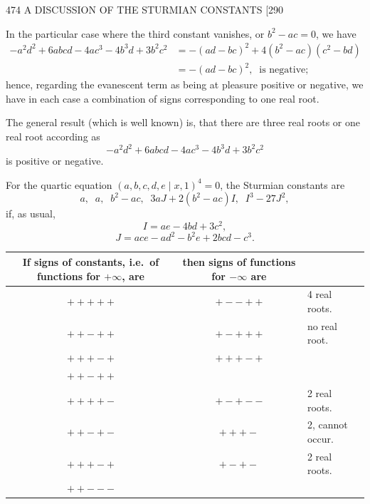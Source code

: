 \documentclass[11pt]{article}
\begin{document}
\begin{center}
474 \hfill A DISCUSSION OF THE STURMIAN CONSTANTS \hfill \textsc{[290}
\end{center}

In the particular case where the third constant vanishes, or $b^{2}-ac=0$,
we have
\begin{align*}
-a^{2}d^{2}+6abcd-4ac^{3}-4b^{3}d+3b^{2}c^{2}
&=-(ad-bc)^{2}+4(b^{2}-ac)(c^{2}-bd)\\
&=-(ad-bc)^{2}, \;\;\text{is negative;}
\end{align*}
hence, regarding the evanescent term as being at pleasure positive or negative, we
have in each case a combination of signs corresponding to one real root.

\smallskip

The general result (which is well known) is, that there are three real roots or
one real root according as
\[ -a^{2}d^{2}+6abcd-4ac^{3}-4b^{3}d+3b^{2}c^{2} \]
is positive or negative.

\smallskip

For the quartic equation $(a,b,c,d,e\mid x,1)^{4}=0$,
the Sturmian constants are
\[ a,\;\; a,\;\; b^{2}-ac,\;\; 3aJ+2(b^{2}-ac)I,\;\; I^{3}-27J^{2}, \]
if, as usual,
\[ I=ae-4bd+3c^{2}, \]
\[ J=ace-ad^{2}-b^{2}e+2bcd-c^{3}. \]

\begin{center}
\begin{tabular}{|c|c|l|}
\hline
\shortstack{If signs of constants,\\ i.e.\ of functions for $+\infty$, are} & \shortstack{then signs of functions\\ for $-\infty$ are} & \\
\hline
$+++++$ & $+--++$ & 4 real roots.\\
$++-++$ & $+-+++$ & no real root.\\
$+++-+$ & $+++-+$ & \\
$++-++$ & & \\
\hline
$++++-$ & $+-+--$ & 2 real roots.\\
$++-+-$ & $+++-$ & 2, cannot occur.\\
$+++-+$ & $+-+-$ & 2 real roots.\\
$++---$ & & \\
\hline
\end{tabular}
\end{center}
\end{document}
